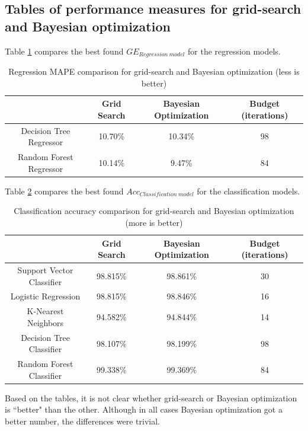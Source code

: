 \documentclass[12pt, letterpaper]{article}
\begin{document}
\subsection{Tables of performance measures for grid-search and Bayesian optimization}

Table \ref{perf_measures_reg} compares the best found $GE_{Regression\ model}$ for the regression models.

\begin{table}[H]
\centering
\caption{Regression MAPE comparison for grid-search and Bayesian optimization (less is better)}
\label{perf_measures_reg}
\begin{tabular}{c|c|c|c} %
                            & Grid Search     & Bayesian Optimization & Budget (iterations) \\ \hline
Decision Tree Regressor     & 10.70\% & 10.34\% & 98\\
Random Forest Regressor     & 10.14\% & 9.47\% & 84\\
\end{tabular}
\end{table}

Table \ref{perf_measures_cls} compares the best found $Acc_{Classification\ model}$ for the classification models.

\begin{table}[H]
\centering
\caption{Classification accuracy comparison for grid-search and Bayesian optimization (more is better)}
\label{perf_measures_cls}
\begin{tabular}{c|c|c|c} %
                            & Grid Search     & Bayesian Optimization & Budget (iterations) \\ \hline
Support Vector Classifier   & 98.815\% & 98.861\% & 30\\
Logistic Regression         & 98.815\% & 98.846\% & 16\\
K-Nearest Neighbors         & 94.582\% & 94.844\% & 14\\
Decision Tree Classifier    & 98.107\% & 98.199\% & 98\\
Random Forest Classifier    & 99.338\% & 99.369\% & 84\\
\end{tabular}
\end{table}

Based on the tables, it is not clear whether grid-search or Bayesian optimization is ``better" than the other. Although in all cases Bayesian optimization got a better number, the differences were trivial.
\end{document}

